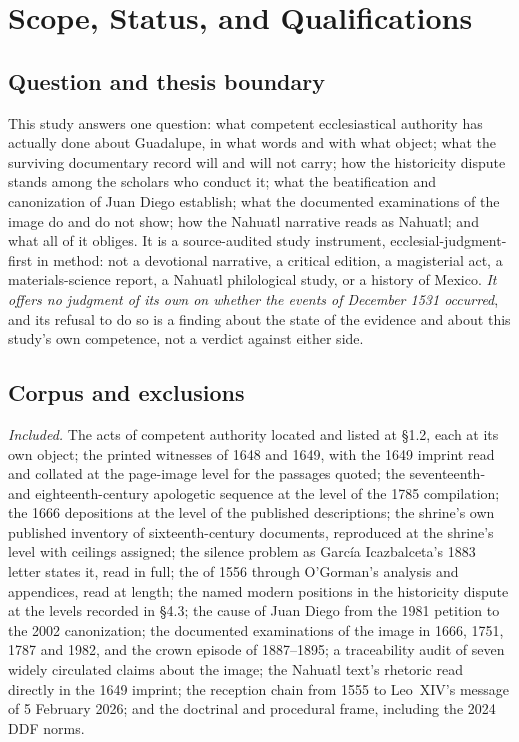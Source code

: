 \sectionguard
\section{Scope, Status, and Qualifications}

\subsection*{Question and thesis boundary}

This study answers one question: what competent ecclesiastical
authority has actually done about Guadalupe, in what words and with
what object; what the surviving documentary record will and will not
carry; how the historicity dispute stands among the scholars who
conduct it; what the beatification and canonization of Juan Diego
establish; what the documented examinations of the image do and do not
show; how the Nahuatl narrative reads as Nahuatl; and what all of it
obliges. It is a source-audited study instrument,
ecclesial-judgment-first in method: not a devotional narrative, a
critical edition, a magisterial act, a materials-science report, a
Nahuatl philological study, or a history of Mexico. \emph{It offers no
judgment of its own on whether the events of December 1531 occurred},
and its refusal to do so is a finding about the state of the evidence
and about this study's own competence, not a verdict against either
side.

\subsection*{Corpus and exclusions}

\emph{Included.} The acts of competent authority located and listed at
\S1.2, each at its own object; the printed witnesses of 1648 and 1649,
with the 1649 imprint read and collated at the page-image level for
the passages quoted; the seventeenth- and eighteenth-century
apologetic sequence at the level of the 1785 compilation; the 1666
depositions at the level of the published descriptions; the shrine's
own published inventory of sixteenth-century documents, reproduced at
the shrine's level with ceilings assigned; the silence problem as
Garc\'ia Icazbalceta's 1883 letter states it, read in full; the
 of 1556 through O'Gorman's analysis and appendices,
read at length; the named modern positions in the historicity dispute
at the levels recorded in \S4.3; the cause of Juan Diego from the 1981
petition to the 2002 canonization; the documented examinations of the
image in 1666, 1751, 1787 and 1982, and the crown episode of
1887--1895; a traceability audit of seven widely circulated claims
about the image; the Nahuatl text's rhetoric read directly in the 1649
imprint; the reception chain from 1555 to Leo~XIV's message of 5
February 2026; and the doctrinal and procedural frame, including the
2024 DDF norms.

